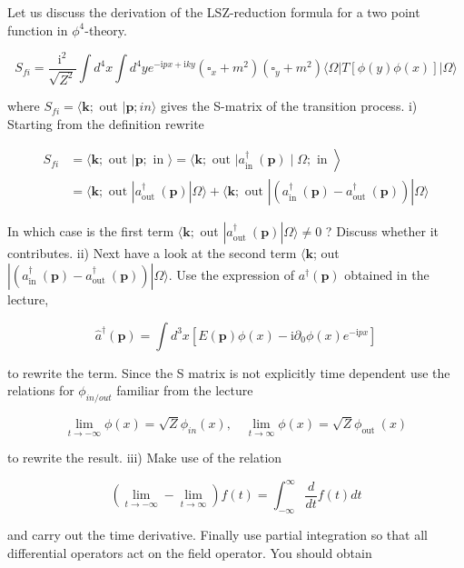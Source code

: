 \documentclass[10pt, letterpaper]{article}
\begin{document}
Let us discuss the derivation of the LSZ-reduction formula for a two point function in $\phi^4$-theory.

$$
S_{f i}=\frac{\mathrm{i}^2}{\sqrt{Z^2}} \int d^4 x \int d^4 y e^{-\mathrm{i} p x+\mathrm{i} k y}\left(\square_x+m^2\right)\left(\square_y+m^2\right)\langle\Omega| T[\phi(y) \phi(x)]|\Omega\rangle
$$

where $S_{f i}=\langle\mathbf{k} ;$ out $\mid \mathbf{p} ; i n\rangle$ gives the S-matrix of the transition process.
i) Starting from the definition rewrite

$$
\begin{aligned}
S_{f i} & \left.=\langle\mathbf{k} ; \text { out }| \mathbf{p} ; \text { in }\rangle=\langle\mathbf{k} ; \text { out }| a_{\text {in }}^{\dagger}(\mathbf{p}) \mid \Omega ; \text { in }\right\rangle \\
& =\langle\mathbf{k} ; \text { out }| a_{\text {out }}^{\dagger}(\mathbf{p})|\Omega\rangle+\langle\mathbf{k} ; \text { out }|\left(a_{\text {in }}^{\dagger}(\mathbf{p})-a_{\text {out }}^{\dagger}(\mathbf{p})\right)|\Omega\rangle
\end{aligned}
$$


In which case is the first term $\langle\mathbf{k} ;$ out $| a_{\text {out }}^{\dagger}(\mathbf{p})|\Omega\rangle \neq 0$ ? Discuss whether it contributes.
ii) Next have a look at the second term $\langle\mathbf{k}$; out $|\left(a_{\text {in }}^{\dagger}(\mathbf{p})-a_{\text {out }}^{\dagger}(\mathbf{p})\right)|\Omega\rangle$. Use the expression of $a^{\dagger}(\mathbf{p})$ obtained in the lecture,

$$
\hat{a}^{\dagger}(\mathbf{p})=\int d^3 x\left[E(\mathbf{p}) \phi(x)-\mathrm{i} \partial_0 \phi(x) e^{-\mathrm{i} p x}\right]
$$

to rewrite the term. Since the S matrix is not explicitly time dependent use the relations for $\phi_{i n / o u t}$ familiar from the lecture

$$
\lim _{t \rightarrow-\infty} \phi(x)=\sqrt{Z} \phi_{i n}(x), \quad \lim _{t \rightarrow \infty} \phi(x)=\sqrt{Z} \phi_{\text {out }}(x)
$$

to rewrite the result.
iii) Make use of the relation

$$
\left(\lim _{t \rightarrow-\infty}-\lim _{t \rightarrow \infty}\right) f(t)=\int_{-\infty}^{\infty} \frac{d}{d t} f(t) d t
$$

and carry out the time derivative. Finally use partial integration so that all differential operators act on the field operator. You should obtain
\end{document}
